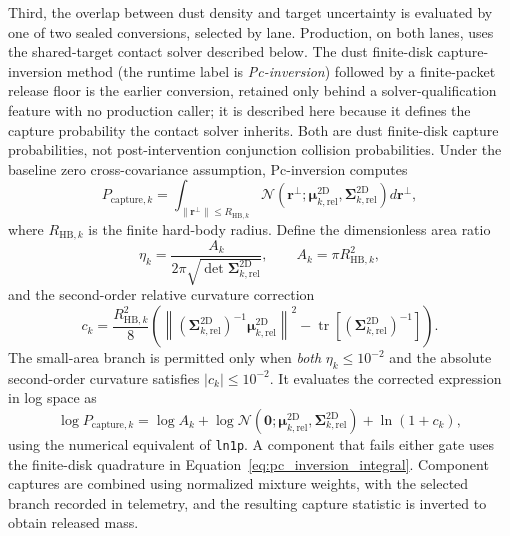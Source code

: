     Third, the overlap between dust density and target uncertainty is evaluated by one of two sealed conversions, selected by lane. Production, on both lanes, uses the shared-target contact solver described below. The dust finite-disk capture-inversion method (the runtime label is \emph{Pc-inversion}) followed by a finite-packet release floor is the earlier conversion, retained only behind a solver-qualification feature with no production caller; it is described here because it defines the capture probability the contact solver inherits. Both are dust finite-disk capture probabilities, not post-intervention conjunction collision probabilities. Under the baseline zero cross-covariance assumption, Pc-inversion computes
    \begin{equation}
        P_{\mathrm{capture},k} =
        \int_{\|\mathbf{r}^{\perp}\|\le R_{\mathrm{HB},k}}
        \mathcal{N}\!\left(\mathbf{r}^{\perp};
        \boldsymbol{\mu}_{k,\mathrm{rel}}^{2\mathrm{D}},
        \boldsymbol{\Sigma}_{k,\mathrm{rel}}^{2\mathrm{D}}\right)
        d\mathbf{r}^{\perp},
        \label{eq:pc_inversion_integral}
    \end{equation}
    where \(R_{\mathrm{HB},k}\) is the finite hard-body radius. Define the dimensionless area ratio
    \[
        \eta_k=\frac{A_k}{2\pi\sqrt{\det\boldsymbol{\Sigma}_{k,\mathrm{rel}}^{2\mathrm{D}}}},
        \qquad A_k=\pi R_{\mathrm{HB},k}^2,
    \]
    and the second-order relative curvature correction
    \[
        c_k=\frac{R_{\mathrm{HB},k}^{2}}{8}
        \left(\left\|\left(\boldsymbol{\Sigma}_{k,\mathrm{rel}}^{2\mathrm{D}}\right)^{-1}
        \boldsymbol{\mu}_{k,\mathrm{rel}}^{2\mathrm{D}}\right\|^2
        -\operatorname{tr}\!\left[\left(\boldsymbol{\Sigma}_{k,\mathrm{rel}}^{2\mathrm{D}}\right)^{-1}\right]\right).
    \]
    The small-area branch is permitted only when \emph{both} \(\eta_k\le10^{-2}\) and the absolute second-order curvature satisfies \(\lvert c_k\rvert\le10^{-2}\). It evaluates the corrected expression in log space as
    \[
        \log P_{\mathrm{capture},k}=\log A_k+
        \log\mathcal{N}(\boldsymbol{0};\boldsymbol{\mu}_{k,\mathrm{rel}}^{2\mathrm{D}},
        \boldsymbol{\Sigma}_{k,\mathrm{rel}}^{2\mathrm{D}})+\ln(1+c_k),
    \]
    using the numerical equivalent of \texttt{ln1p}. A component that fails either gate uses the finite-disk quadrature in Equation~\eqref{eq:pc_inversion_integral}. Component captures are combined using normalized mixture weights, with the selected branch recorded in telemetry, and the resulting capture statistic is inverted to obtain released mass.


